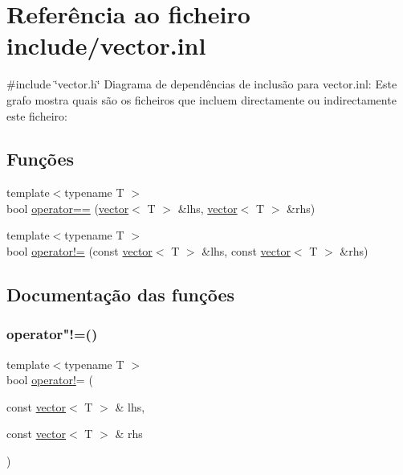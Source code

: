 \hypertarget{vector_8inl}{}\section{Referência ao ficheiro include/vector.inl}
\label{vector_8inl}
{\ttfamily \#include \char`\"{}vector.\+h\char`\"{}}\newline
Diagrama de dependências de inclusão para vector.\+inl\+:
Este grafo mostra quais são os ficheiros que incluem directamente ou indirectamente este ficheiro\+:
\subsection*{Funções}
\begin{DoxyCompactItemize}
\item 
{\footnotesize template$<$typename T $>$ }\\bool \hyperlink{vector_8inl_a7c456a6a390a779890d09b7eb9fc9f47}{operator==} (\hyperlink{classsc_1_1vector}{vector}$<$ T $>$ \&lhs, \hyperlink{classsc_1_1vector}{vector}$<$ T $>$ \&rhs)
\item 
{\footnotesize template$<$typename T $>$ }\\bool \hyperlink{vector_8inl_aec5c54cbcb8ee83a1b0552d4a7a7a016}{operator!=} (const \hyperlink{classsc_1_1vector}{vector}$<$ T $>$ \&lhs, const \hyperlink{classsc_1_1vector}{vector}$<$ T $>$ \&rhs)
\end{DoxyCompactItemize}


\subsection{Documentação das funções}
\mbox{\label{vector_8inl_aec5c54cbcb8ee83a1b0552d4a7a7a016}} 
\subsubsection{\texorpdfstring{operator"!=()}{operator!=()}}
{\footnotesize\ttfamily template$<$typename T $>$ \\
bool \hyperlink{game__classes_8hpp_a5dea3f07ccd43cf7042c728d769e92fc}{operator!}= (\begin{DoxyParamCaption}\item[{const \hyperlink{classsc_1_1vector}{vector}$<$ T $>$ \&}]{lhs,  }\item[{const \hyperlink{classsc_1_1vector}{vector}$<$ T $>$ \&}]{rhs }\end{DoxyParamCaption})}

